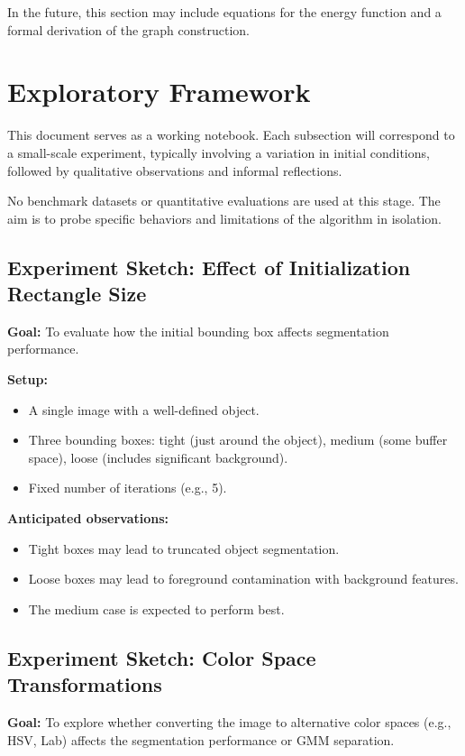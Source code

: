 \documentclass[11pt]{article}
\begin{document}
In the future, this section may include equations for the energy function and a formal derivation of the graph construction.

\section{Exploratory Framework}

This document serves as a working notebook. Each subsection will correspond to a small-scale experiment, typically involving a variation in initial conditions, followed by qualitative observations and informal reflections.

No benchmark datasets or quantitative evaluations are used at this stage. The aim is to probe specific behaviors and limitations of the algorithm in isolation.

\subsection{Experiment Sketch: Effect of Initialization Rectangle Size}

\textbf{Goal:} To evaluate how the initial bounding box affects segmentation performance.

\textbf{Setup:}
\begin{itemize}[itemsep=1pt]
    \item A single image with a well-defined object.
    \item Three bounding boxes: tight (just around the object), medium (some buffer space), loose (includes significant background).
    \item Fixed number of iterations (e.g., 5).
\end{itemize}

\textbf{Anticipated observations:}
\begin{itemize}
    \item Tight boxes may lead to truncated object segmentation.
    \item Loose boxes may lead to foreground contamination with background features.
    \item The medium case is expected to perform best.
\end{itemize}

\subsection{Experiment Sketch: Color Space Transformations}

\textbf{Goal:} To explore whether converting the image to alternative color spaces (e.g., HSV, Lab) affects the segmentation performance or GMM separation.
\end{document}
